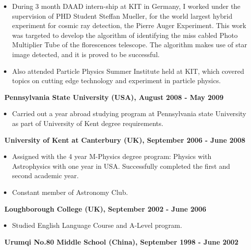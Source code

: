 \documentclass[letterpaper,12pt]{letter}
\begin{document}
\begin{itemize}
\item \textrm{\normalsize During 3 month DAAD intern-ship at KIT in Germany, I worked under the supervision of PHD Student Steffan Mueller, for the world largest hybrid experiment for cosmic ray detection, the Pierre Auger Experiment. This work was targeted to develop the algorithm of identifying the miss cabled Photo Multiplier Tube of the florescences telescope. The algorithm makes use of star image detected, and it is proved to be successful.}
\item \textrm{\normalsize Also attended Particle Physics Summer Institute held at KIT, which covered topics on cutting edge technology and experiment in particle physics.}
\end{itemize}

\textbf{\normalsize ~Pennsylvania State University (USA), August 2008 - May 2009}  \\[-8mm] 

\begin{itemize}
\item \textrm{\normalsize Carried out a year abroad studying program at Pennsylvania state University as part of University of Kent degree requirements.}
\end{itemize}

\textbf{\normalsize ~University of Kent at Canterbury (UK), September 2006 - June 2008}  \\[-8mm] 
\begin{itemize}
\item \textrm{\normalsize Assigned with the 4 year M-Physics degree program: Physics with Astrophysics with one year in USA. Successfully completed the first and second academic year.}
\item \textrm{\normalsize Constant member of Astronomy Club.}
\end{itemize}

\textbf{\normalsize ~Loughborough College (UK), September 2002 - June 2006}  \\[-8mm] 
\begin{itemize}
\item \textrm{\normalsize Studied English Language Course and A-Level program.}
\end{itemize}

\textbf{\normalsize ~Urumqi No.80 Middle School (China), September 1998 - June 2002} \\[-8mm] 
\end{document}
